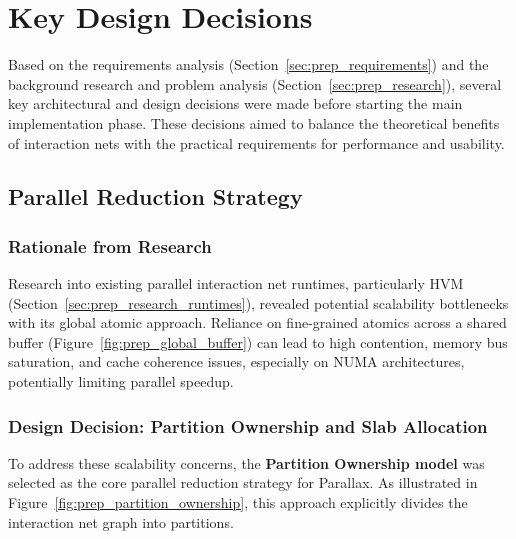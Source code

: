 \section{Key Design Decisions}\label{sec:prep_design_decisions}

Based on the requirements analysis (Section~\ref{sec:prep_requirements}) and the background research and problem analysis (Section~\ref{sec:prep_research}), several key architectural and design decisions were made before starting the main implementation phase. These decisions aimed to balance the theoretical benefits of interaction nets with the practical requirements for performance and usability.

\subsection{Parallel Reduction Strategy}\label{sec:prep_decision_runtime}

\subsubsection*{Rationale from Research}
Research into existing parallel interaction net runtimes, particularly HVM (Section~\ref{sec:prep_research_runtimes}), revealed potential scalability bottlenecks with its global atomic approach. Reliance on fine-grained atomics across a shared buffer (Figure~\ref{fig:prep_global_buffer}) can lead to high contention, memory bus saturation, and cache coherence issues, especially on NUMA architectures, potentially limiting parallel speedup.

\subsubsection*{Design Decision: Partition Ownership and Slab Allocation}
To address these scalability concerns, the \textbf{Partition Ownership model} was selected as the core parallel reduction strategy for Parallax. As illustrated in Figure~\ref{fig:prep_partition_ownership}, this approach explicitly divides the interaction net graph into partitions.


